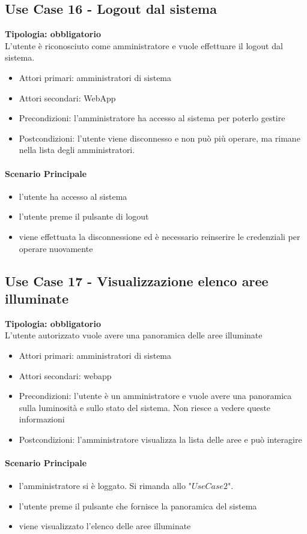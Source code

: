 \documentclass[12pt]{article}
\begin{document}
\subsection{Use Case 16 - Logout dal sistema}
\textbf{Tipologia: obbligatorio} \\
L'utente è riconosciuto come amministratore e vuole effettuare il logout dal sistema.
\begin{itemize}
	\item Attori primari: amministratori di sistema
	\item Attori secondari: WebApp
	\item Precondizioni: l'amministratore ha accesso al sistema per poterlo gestire
	\item Postcondizioni: l'utente viene disconnesso e non può più operare, ma rimane nella lista degli amministratori.
\end{itemize}
\paragraph{Scenario Principale}
\begin{itemize}
	\item l'utente ha accesso al sistema
	\item l'utente preme il pulsante di logout
	\item viene effettuata la disconnessione ed è necessario reinserire le credenziali per operare nuovamente
\end{itemize}

\subsection{Use Case 17 - Visualizzazione elenco aree illuminate}
\textbf{Tipologia: obbligatorio} \\
L'utente autorizzato vuole avere una panoramica delle aree illuminate
\begin{itemize}
	\item Attori primari: amministratori di sistema
	\item Attori secondari: webapp
	\item Precondizioni: l'utente è un amministratore e vuole avere una panoramica sulla luminosità e sullo stato del sistema. Non riesce a vedere queste informazioni
	\item Postcondizioni: l'amministratore visualizza la lista delle aree e può interagire
\end{itemize}
\paragraph{Scenario Principale}
\begin{itemize}
	\item l'amministratore si è loggato. Si rimanda allo "$Use Case 2$".
	\item l'utente preme il pulsante che fornisce la panoramica del sistema
	\item viene visualizzato l'elenco delle aree illuminate
\end{itemize}
\end{document}
